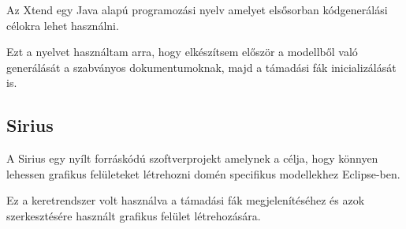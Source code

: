 Az Xtend egy Java alapú programozási nyelv amelyet elsősorban kódgenerálási célokra lehet használni.

Ezt a nyelvet használtam arra, hogy elkészítsem először a modellből való generálását a szabványos dokumentumoknak, majd a támadási fák inicializálását is.

\subsection{Sirius}

A Sirius egy nyílt forráskódú szoftverprojekt amelynek a célja, hogy könnyen lehessen grafikus felületeket létrehozni domén specifikus modellekhez Eclipse-ben.

Ez a keretrendszer volt használva a támadási fák megjelenítéséhez és azok szerkesztésére használt grafikus felület létrehozására.
